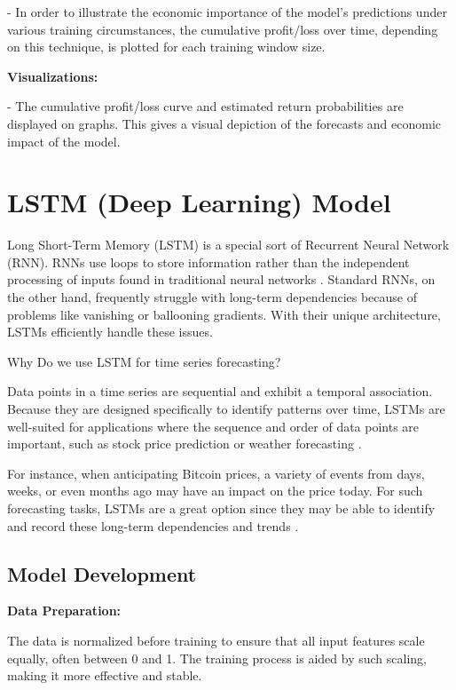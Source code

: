 -	In order to illustrate the economic importance of the model's predictions under various training circumstances, the cumulative profit/loss over time, depending on this technique, is plotted for each training window size.

\textbf{Visualizations:}

-	The cumulative profit/loss curve and estimated return probabilities are displayed on graphs. This gives a visual depiction of the forecasts and economic impact of the model.

\goodbreak

\section{LSTM (Deep Learning) Model}

Long Short-Term Memory (LSTM) is a special sort of Recurrent Neural Network (RNN). RNNs use loops to store information rather than the independent processing of inputs found in traditional neural networks \citep{Hochreiter1997LongSM}. Standard RNNs, on the other hand, frequently struggle with long-term dependencies because of problems like vanishing or ballooning gradients. With their unique architecture, LSTMs efficiently handle these issues.

Why Do we use LSTM for time series forecasting?

Data points in a time series are sequential and exhibit a temporal association. Because they are designed specifically to identify patterns over time, LSTMs are well-suited for applications where the sequence and order of data points are important, such as stock price prediction or weather forecasting \citep{DBLP:conf/nips/SutskeverVL14}.

For instance, when anticipating Bitcoin prices, a variety of events from days, weeks, or even months ago may have an impact on the price today. For such forecasting tasks, LSTMs are a great option since they may be able to identify and record these long-term dependencies and trends \citep{moghar2020stock}.

\subsection{Model Development }

\textbf{Data Preparation:}

The data is normalized before training to ensure that all input features scale equally, often between 0 and 1. The training process is aided by such scaling, making it more effective and stable.

